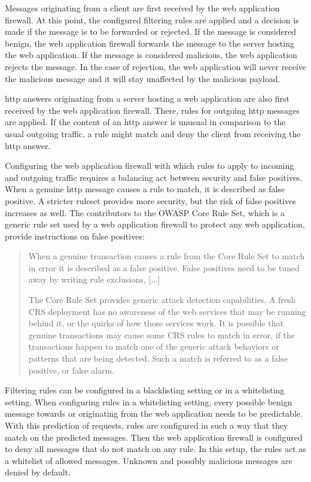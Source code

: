 Messages originating from a client are first received by the web application firewall.
At this point, the configured filtering rules are applied and a decision is made if the message is to be forwarded or rejected.
If the message is considered benign, the web application firewall forwards the message to the server hosting the web application.
If the message is considered malicious, the web application rejects the message.
In the case of rejection, the web application will never receive the malicious message and it will stay unaffected by the malicious payload.

\acrshort{http} answers originating from a server hosting a web application are also first received by the web application firewall.
There, rules for outgoing \acrshort{http} messages are applied.
If the content of an \acrshort{http} answer is unusual in comparison to the usual outgoing traffic, a rule might match and deny the client from receiving the \acrshort{http} answer.

Configuring the web application firewall with which rules to apply to incoming and outgoing traffic requires a balancing act between security and false positives.
When a genuine \acrshort{http} message causes a rule to match, it is described as false positive.
A stricter ruleset provides more security, but the risk of false positives increases as well.
The contributors to the OWASP Core Rule Set, which is a generic rule set used by a web application firewall to protect any web application, provide instructions on false positives:

\begin{quote}
	When a genuine transaction causes a rule from the Core Rule Set to match in error it is described as a false positive. False positives need to be tuned away by writing rule exclusions, [...]

	The Core Rule Set provides generic attack detection capabilities. A fresh CRS deployment has no awareness of the web services that may be running behind it, or the quirks of how those services work. It is possible that genuine transactions may cause some CRS rules to match in error, if the transactions happen to match one of the generic attack behaviors or patterns that are being detected. Such a match is referred to as a false positive, or false alarm. \cite{OWASP/crsfpt}
\end{quote}

Filtering rules can be configured in a blacklisting setting or in a whitelisting setting.
When configuring rules in a whitelisting setting, every possible benign message towards or originating from the web application needs to be predictable. 
With this prediction of requests, rules are configured in such a way that they match on the predicted messages. 
Then the web application firewall is configured to deny all messages that do not match on any rule. 
In this setup, the rules act as a whitelist of allowed messages. Unknown and possibly malicious messages are denied by default.

